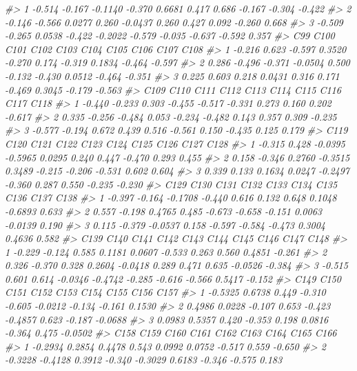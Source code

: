 \documentclass[]{book}
\newenvironment{Shaded}{\begin{snugshade}}{\end{snugshade}}
\newcommand{\CommentTok}[1]{\textcolor[rgb]{0.56,0.35,0.01}{\textit{#1}}}
\begin{document}
\begin{Shaded}
\begin{Highlighting}[]
{{{{{\CommentTok{#> 1 -0.514 -0.167 -0.1140 -0.370  0.6681  0.417  0.686 -0.167 -0.304 -0.422}
\CommentTok{#> 2 -0.146 -0.566  0.0277  0.260 -0.0437  0.260  0.427  0.092 -0.260  0.668}
\CommentTok{#> 3 -0.509 -0.265  0.0538 -0.422 -0.2022 -0.579 -0.035 -0.637 -0.592  0.357}
\CommentTok{#>      C99   C100   C101    C102   C103   C104   C105   C106   C107   C108}
\CommentTok{#> 1 -0.216  0.623 -0.597  0.3520 -0.270  0.174 -0.319 0.1834 -0.464 -0.597}
\CommentTok{#> 2  0.286 -0.496 -0.371 -0.0504  0.500 -0.132 -0.430 0.0512 -0.464 -0.351}
\CommentTok{#> 3  0.225  0.603  0.218  0.0431  0.316  0.171 -0.469 0.3045 -0.179 -0.563}
\CommentTok{#>     C109   C110   C111   C112   C113   C114  C115   C116  C117   C118}
\CommentTok{#> 1 -0.440 -0.233  0.303 -0.455 -0.517 -0.331 0.273  0.160 0.202 -0.617}
\CommentTok{#> 2  0.335 -0.256 -0.484  0.053 -0.234 -0.482 0.143  0.357 0.309 -0.235}
\CommentTok{#> 3 -0.577 -0.194  0.672  0.439  0.516 -0.561 0.150 -0.435 0.125  0.179}
\CommentTok{#>     C119   C120    C121    C122    C123   C124   C125   C126   C127   C128}
\CommentTok{#> 1 -0.315  0.428 -0.0395 -0.5965  0.0295  0.240  0.447 -0.470  0.293  0.455}
\CommentTok{#> 2  0.158 -0.346  0.2760 -0.3515  0.3489 -0.215 -0.206 -0.531  0.602  0.604}
\CommentTok{#> 3  0.339  0.133  0.1634  0.0247 -0.2497 -0.360  0.287  0.550 -0.235 -0.230}
\CommentTok{#>     C129   C130    C131   C132   C133   C134   C135   C136    C137  C138}
\CommentTok{#> 1 -0.397 -0.164 -0.1708 -0.440  0.616  0.132  0.648 0.1048 -0.6893 0.633}
\CommentTok{#> 2  0.557 -0.198  0.4765  0.485 -0.673 -0.658 -0.151 0.0063 -0.0139 0.190}
\CommentTok{#> 3  0.115 -0.379 -0.0537  0.158 -0.597 -0.584 -0.473 0.3004  0.4636 0.582}
\CommentTok{#>     C139   C140  C141    C142    C143   C144   C145   C146    C147   C148}
\CommentTok{#> 1 -0.229 -0.124 0.585  0.1181  0.0607 -0.533  0.263  0.560  0.4851 -0.261}
\CommentTok{#> 2  0.326 -0.370 0.328  0.2604 -0.0418  0.289  0.471  0.635 -0.0526 -0.384}
\CommentTok{#> 3 -0.515  0.601 0.614 -0.0346 -0.4742 -0.285 -0.616 -0.566  0.5417 -0.152}
\CommentTok{#>      C149   C150   C151   C152   C153    C154   C155   C156    C157}
\CommentTok{#> 1 -0.5325 0.6738  0.449 -0.310 -0.605 -0.0212 -0.134 -0.161  0.1530}
\CommentTok{#> 2  0.4986 0.0228 -0.107  0.653 -0.423 -0.4857  0.623 -0.187 -0.0688}
\CommentTok{#> 3  0.0983 0.5357  0.420 -0.353  0.198  0.0816 -0.364  0.475 -0.0502}
\CommentTok{#>      C158    C159   C160   C161    C162    C163   C164   C165   C166}
\CommentTok{#> 1 -0.2934  0.2854 0.4478  0.543  0.0992  0.0752 -0.517  0.559 -0.650}
\CommentTok{#> 2 -0.3228 -0.4128 0.3912 -0.340 -0.3029  0.6183 -0.346 -0.575  0.183}
}}}}}
\end{Highlighting}
\end{Shaded}
\end{document}
